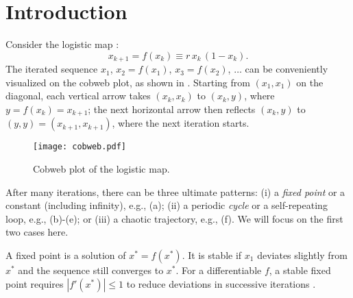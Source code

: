 \documentclass{ws-ijbc}
\begin{document}



\twocolumn
%
%
\section{Introduction}
%
%

Consider the logistic map \cite{may, strogatz}:
%
\begin{equation}
  x_{k+1} = f(x_k) \equiv r \, x_k \, ( 1 - x_k ).
\label{eq:logmap}
\end{equation}
%
The iterated sequence $x_1$,
  $x_2 = f(x_1)$,
  $x_3 = f(x_2)$, $\ldots$
can be conveniently visualized on the cobweb plot,
  as shown in .
%
Starting from $(x_1, x_1)$ on the diagonal,
  each vertical arrow takes $(x_k, x_k)$ to $(x_k, y)$,
  where $y = f(x_k) = x_{k+1}$;
the next horizontal arrow then reflects $(x_k, y)$ to
  $(y, y) = (x_{k+1}, x_{k+1})$,
  where the next iteration starts.
%
%
\begin{figure}[h]
  \begin{center}
  \begin{minipage}{\linewidth}
        \texttt{[image: cobweb.pdf]}
  \end{minipage}%
  \end{center}
  \caption{\label{fig:cobweb}
  Cobweb plot of the logistic map.}
\end{figure}
%
%
After many iterations, there can be three ultimate patterns:
  (i) a \emph{fixed point} or a constant (including infinity),
      e.g., (a);
  (ii) a periodic \emph{cycle} or a self-repeating loop,
      e.g., (b)-(e);
or
  (iii) a chaotic trajectory,
      e.g., (f).
We will focus on the first two cases here.


A fixed point is a solution of $x^* = f(x^*)$.
%
It is stable if $x_1$ deviates slightly from $x^*$
  and the sequence still converges to $x^*$.
%
For a differentiable $f$,
  a stable fixed point requires $|f'(x^*)| \le 1$
  to reduce deviations in successive iterations \cite{strogatz}.
\end{document}
